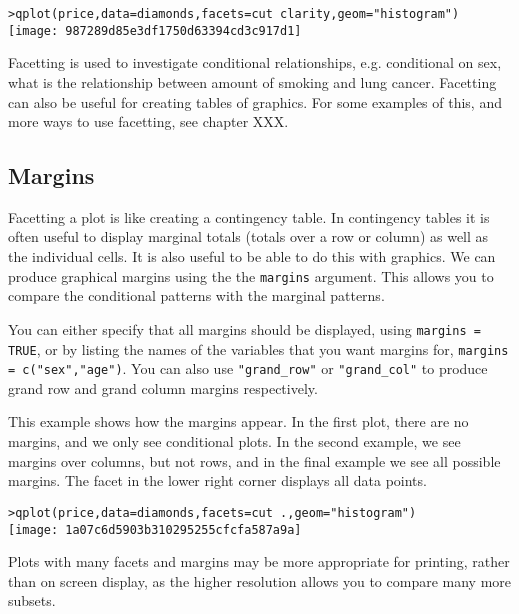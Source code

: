 \begin{alltt}
> qplot(price, data = diamonds, facets = cut ~ clarity, geom = "histogram")
\texttt{[image: 987289d85e3df1750d63394cd3c917d1]}

\end{alltt}

Facetting is used to investigate conditional relationships, e.g. conditional on sex, what is the relationship between amount of smoking and lung cancer.  Facetting can also be useful for creating tables of graphics.  For some examples of this, and more ways to use facetting, see chapter XXX.

\subsection{Margins}\label{sub:margins}

Facetting a plot is like creating a contingency table.  In contingency tables it is often useful to display marginal totals (totals over a row or column) as well as the individual cells.  It is also useful to be able to do this with graphics.  We can produce graphical margins using the the {\tt margins} argument.  This allows you to compare the conditional patterns with the marginal patterns.

You can either specify that all margins should be displayed, using {\tt margins = TRUE}, or by listing the names of the variables that you want margins for, {\tt margins = c("sex","age")}.  You can also use \verb|"grand_row"| or \verb|"grand_col"| to produce grand row and grand column margins respectively.

This example shows how the margins appear.  In the first plot, there are no margins, and we only see conditional plots.  In the second example, we see margins over columns, but not rows, and in the final example we see all possible margins.  The facet in the lower right corner displays all data points.

\begin{alltt}
> qplot(price, data = diamonds, facets = cut ~ ., geom = "histogram")
\texttt{[image: 1a07c6d5903b310295255cfcfa587a9a]}

\end{alltt}

Plots with many facets and margins may be more appropriate for printing, rather than on screen display, as the higher resolution allows you to compare many more subsets.

